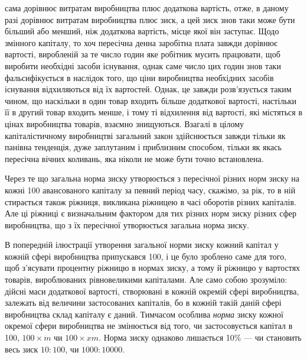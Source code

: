 \parcont{}  %
сама дорівнює витратам виробництва плюс додаткова вартість,
отже, в даному разі дорівнює витратам виробництва плюс зиск,
а цей зиск знов таки може бути більший або менший, ніж додаткова вартість, місце якої він заступає.
Щодо змінного капіталу, то хоч пересічна денна заробітна плата завжди дорівнює вартості, виробленій
за те число годин яке робітник
мусить працювати, щоб виробити необхідні засоби існування,
однак саме число цих годин знов таки фальсифікується в наслідок того, що ціни виробництва необхідних
засобів існування
відхиляються від їх вартостей. Однак, це завжди розв’язується
таким чином, що наскільки в один товар входить більше додаткової вартості, настільки її в другий
товар входить менше,
і тому ті відхилення від вартості, які містяться в цінах виробництва товарів, взаємно знищуються.
Взагалі в цілому капіталістичному виробництві загальний закон здійснюється завжди
тільки як панівна тенденція, дуже заплутаним і приблизним
способом, тільки як якась пересічна вічних коливань, яка ніколи
не може бути точно встановлена.

Через те що загальна норма зиску утворюється з пересічної
різних норм зиску на кожні 100 авансованого капіталу за певний
період часу, скажімо, за рік, то в ній стирається також ріжниця,
викликана ріжницею в часі оборотів різних капіталів. Але ці
ріжниці є визначальним фактором для тих різних норм зиску
різних сфер виробництва, що з їх пересічної утворюється загальна норма зиску.

В попередній ілюстрації утворення загальної норми зиску
кожний капітал у кожній сфері виробництва припускався \deq{} 100,
і це було зроблено саме для того, щоб з’ясувати процентну
ріжницю в нормах зиску, а тому й ріжницю у вартостях товарів,
вироблюваних рівновеликими капіталами. Але само собою зрозуміло: дійсні маси додаткової вартості,
створювані в кожній
окремій сфері виробництва, залежать від величини застосованих
капіталів, бо в кожній такій даній сфері виробництва склад капіталу є даний. Тимчасом особлива \emph{норма}
зиску кожної окремої
сфери виробництва не змінюється від того, чи застосовується
капітал в 100, $100 × m$ чи $100 × xm$. Норма зиску однаково лишається 10\% — чи становить весь зиск $10 :
100$, чи $1000 : \num{10000}$.

